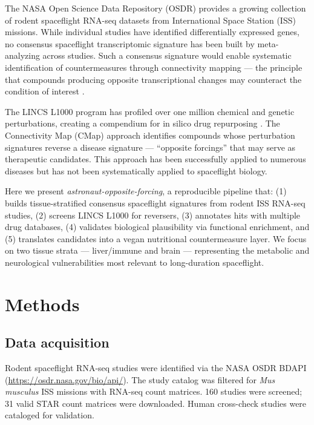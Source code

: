 \documentclass[11pt,a4paper]{article}
\begin{document}
The NASA Open Science Data Repository (OSDR) provides a growing collection of rodent spaceflight 
RNA-seq datasets from International Space Station (ISS) missions. While individual studies have 
identified differentially expressed genes, no consensus spaceflight transcriptomic signature has been 
built by meta-analyzing across studies. Such a consensus signature would enable systematic 
identification of countermeasures through connectivity mapping --- the principle that compounds 
producing opposite transcriptional changes may counteract the condition of interest \citep{subramanian2017next}.

The LINCS L1000 program has profiled over one million chemical and genetic perturbations, creating 
a compendium for in silico drug repurposing \citep{subramanian2017next}. The Connectivity Map (CMap) 
approach identifies compounds whose perturbation signatures reverse a disease signature --- 
``opposite forcings'' that may serve as therapeutic candidates. This approach has been successfully 
applied to numerous diseases but has not been systematically applied to spaceflight biology.

Here we present \textit{astronaut-opposite-forcing}, a reproducible pipeline that: (1) builds 
tissue-stratified consensus spaceflight signatures from rodent ISS RNA-seq studies, (2) screens LINCS 
L1000 for reversers, (3) annotates hits with multiple drug databases, (4) validates biological 
plausibility via functional enrichment, and (5) translates candidates into a vegan nutritional 
countermeasure layer. We focus on two tissue strata --- liver/immune and brain --- representing the 
metabolic and neurological vulnerabilities most relevant to long-duration spaceflight.

\section{Methods}

\subsection{Data acquisition}
Rodent spaceflight RNA-seq studies were identified via the NASA OSDR BDAPI 
(\url{https://osdr.nasa.gov/bio/api/}). The study catalog was filtered for \textit{Mus musculus} 
ISS missions with RNA-seq count matrices. 160 studies were screened; 31 valid STAR count matrices 
were downloaded. Human cross-check studies were cataloged for validation.
\end{document}
